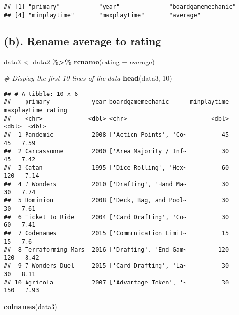 \documentclass[
]{article}
\newenvironment{Shaded}{\begin{snugshade}}{\end{snugshade}}
\newcommand{\AttributeTok}[1]{\textcolor[rgb]{0.13,0.29,0.53}{#1}}
\newcommand{\CommentTok}[1]{\textcolor[rgb]{0.56,0.35,0.01}{\textit{#1}}}
\newcommand{\DecValTok}[1]{\textcolor[rgb]{0.00,0.00,0.81}{#1}}
\newcommand{\FunctionTok}[1]{\textcolor[rgb]{0.13,0.29,0.53}{\textbf{#1}}}
\newcommand{\NormalTok}[1]{#1}
\newcommand{\OtherTok}[1]{\textcolor[rgb]{0.56,0.35,0.01}{#1}}
\newcommand{\SpecialCharTok}[1]{\textcolor[rgb]{0.81,0.36,0.00}{\textbf{#1}}}
\begin{document}
\begin{verbatim}
## [1] "primary"           "year"              "boardgamemechanic"
## [4] "minplaytime"       "maxplaytime"       "average"
\end{verbatim}

\hypertarget{b.-rename-average-to-rating}{%
\subsection{\texorpdfstring{(b). Rename \textbf{average} to \textbf{rating}}{(b). Rename average to rating}}\label{b.-rename-average-to-rating}}

\begin{Shaded}
\begin{Highlighting}[]
\NormalTok{data3 }\OtherTok{\textless{}{-}}\NormalTok{ data2 }\SpecialCharTok{\%\textgreater{}\%} \FunctionTok{rename}\NormalTok{(}\AttributeTok{rating =}\NormalTok{ average)}

\CommentTok{\# Display the first 10 lines of the data}
\FunctionTok{head}\NormalTok{(data3, }\DecValTok{10}\NormalTok{)}
\end{Highlighting}
\end{Shaded}

\begin{verbatim}
## # A tibble: 10 x 6
##    primary            year boardgamemechanic      minplaytime maxplaytime rating
##    <chr>             <dbl> <chr>                        <dbl>       <dbl>  <dbl>
##  1 Pandemic           2008 ['Action Points', 'Co~          45          45   7.59
##  2 Carcassonne        2000 ['Area Majority / Inf~          30          45   7.42
##  3 Catan              1995 ['Dice Rolling', 'Hex~          60         120   7.14
##  4 7 Wonders          2010 ['Drafting', 'Hand Ma~          30          30   7.74
##  5 Dominion           2008 ['Deck, Bag, and Pool~          30          30   7.61
##  6 Ticket to Ride     2004 ['Card Drafting', 'Co~          30          60   7.41
##  7 Codenames          2015 ['Communication Limit~          15          15   7.6 
##  8 Terraforming Mars  2016 ['Drafting', 'End Gam~         120         120   8.42
##  9 7 Wonders Duel     2015 ['Card Drafting', 'La~          30          30   8.11
## 10 Agricola           2007 ['Advantage Token', '~          30         150   7.93
\end{verbatim}

\begin{Shaded}
\begin{Highlighting}[]
\FunctionTok{colnames}\NormalTok{(data3)}
\end{Highlighting}
\end{Shaded}
\end{document}

